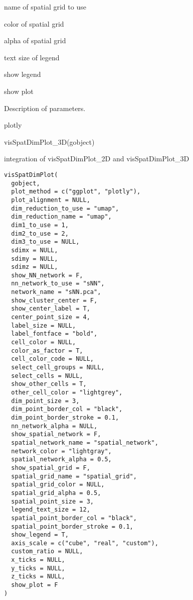 \documentclass[a4paper]{book}
\begin{document}
\begin{Arguments}
\begin{ldescription}
\item[\code{spatial\_grid\_name}] name of spatial grid to use

\item[\code{spatial\_grid\_color}] color of spatial grid

\item[\code{spatial\_grid\_alpha}] alpha of spatial grid

\item[\code{legend\_text\_size}] text size of legend

\item[\code{show\_legend}] show legend

\item[\code{show\_plot}] show plot
\end{ldescription}
\end{Arguments}
%
\begin{Details}\relax
Description of parameters.
\end{Details}
%
\begin{Value}
plotly
\end{Value}
%
\begin{Examples}
\begin{ExampleCode}
    visSpatDimPlot_3D(gobject)
\end{ExampleCode}
\end{Examples}
%
\begin{Description}\relax
integration of visSpatDimPlot\_2D and visSpatDimPlot\_3D
\end{Description}
%
\begin{Usage}
\begin{verbatim}
visSpatDimPlot(
  gobject,
  plot_method = c("ggplot", "plotly"),
  plot_alignment = NULL,
  dim_reduction_to_use = "umap",
  dim_reduction_name = "umap",
  dim1_to_use = 1,
  dim2_to_use = 2,
  dim3_to_use = NULL,
  sdimx = NULL,
  sdimy = NULL,
  sdimz = NULL,
  show_NN_network = F,
  nn_network_to_use = "sNN",
  network_name = "sNN.pca",
  show_cluster_center = F,
  show_center_label = T,
  center_point_size = 4,
  label_size = NULL,
  label_fontface = "bold",
  cell_color = NULL,
  color_as_factor = T,
  cell_color_code = NULL,
  select_cell_groups = NULL,
  select_cells = NULL,
  show_other_cells = T,
  other_cell_color = "lightgrey",
  dim_point_size = 3,
  dim_point_border_col = "black",
  dim_point_border_stroke = 0.1,
  nn_network_alpha = NULL,
  show_spatial_network = F,
  spatial_network_name = "spatial_network",
  network_color = "lightgray",
  spatial_network_alpha = 0.5,
  show_spatial_grid = F,
  spatial_grid_name = "spatial_grid",
  spatial_grid_color = NULL,
  spatial_grid_alpha = 0.5,
  spatial_point_size = 3,
  legend_text_size = 12,
  spatial_point_border_col = "black",
  spatial_point_border_stroke = 0.1,
  show_legend = T,
  axis_scale = c("cube", "real", "custom"),
  custom_ratio = NULL,
  x_ticks = NULL,
  y_ticks = NULL,
  z_ticks = NULL,
  show_plot = F
)
\end{verbatim}
\end{Usage}
\end{document}
